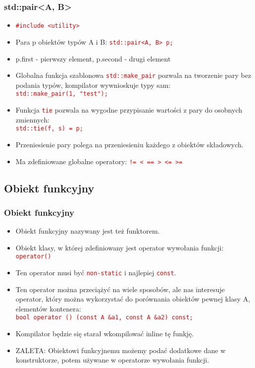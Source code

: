 \documentclass[compress]{beamer}
\newcommand{\red}[1]{\textcolor{red}{#1}}
\newcommand{\code}[1]{\texttt{\red{#1}}}
\begin{document}
\begin{frame}

  \frametitle{std::pair<A, B>}

  \begin{itemize}
  \item \code{\#include <utility>}
  \item Para p obiektów typów A i B: \code{std::pair<A, B> p;}
  \item p.first - pierwszy element, p.second - drugi element
  \item Globalna funkcja szablonowa \code{std::make\_pair} pozwala na
    tworzenie pary bez podania typów, kompilator wywnioskuje typy
    sam:\\ \code{std::make\_pair(1, "test");}
  \item Funkcja \code{tie} pozwala na wygodne przypisanie wartości z
    pary do osobnych zmiennych:\\ \code{std::tie(f, s) = p;}
  \item Przeniesienie pary polega na przeniesieniu każdego z obiektów
    składowych.
  \item Ma zdefiniowane globalne operatory: \code{!= < == > <= >=}
  \end{itemize}

\end{frame}


\subsection{Obiekt funkcyjny}

\begin{frame}

  \frametitle{Obiekt funkcyjny}

  \begin{itemize}
  \item Obiekt funkcyjny nazywany jest też funktorem.
  \item Obiekt klasy, w której zdefiniowany jest operator wywołania
    funkcji: \code{operator()}
  \item Ten operator musi być \code{non-static} i najlepiej
    \code{const}.
  \item Ten operator można przeciążyć na wiele sposobów, ale nas
    interesuje operator, który można wykorzystać do porównania
    obiektów pewnej klasy A, elementów kontenera:\\ \code{bool
      operator () (const A \&a1, const A \&a2) const;}
  \item Kompilator będzie się starał wkompilować inline tę funkję.
  \item ZALETA: Obiektowi funkcyjnemu możemy podać dodatkowe dane w
    konstruktorze, potem używane w operatorze wywołania funkcji.
  \end{itemize}

\end{frame}
\end{document}
